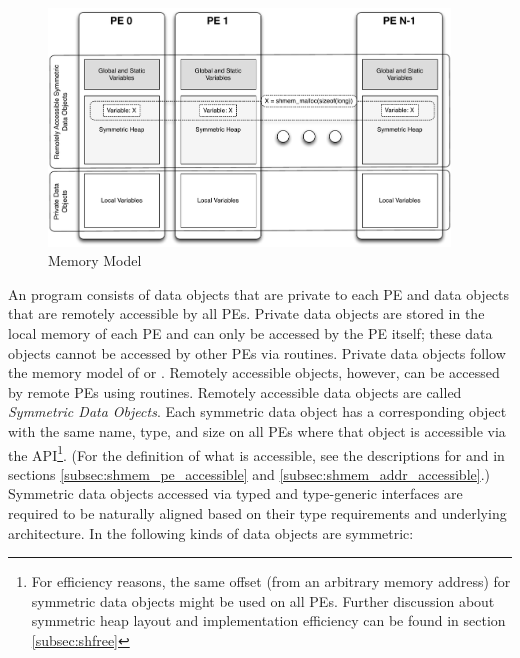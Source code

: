 \begin{figure}[h]
\includegraphics[width=0.95\textwidth]{figures/mem_model}      
\caption{\openshmem Memory Model}
\label{fig:mem_model}                                               
\end{figure}      
%
An \openshmem program consists of data objects that are private to each \ac{PE}
and data  objects that are remotely accessible by all \acp{PE}. Private data
objects are stored in the local memory of each \ac{PE} and can only be accessed
by the \ac{PE} itself; these data objects cannot be accessed by other \acp{PE}
via \openshmem routines. Private data objects follow the memory model of
\Cstd or \Fortran. Remotely accessible objects, however, can be accessed by
remote \acp{PE} using \openshmem routines.  Remotely accessible data objects are
called \emph{Symmetric Data Objects}.  Each symmetric data object has a
corresponding object with the same name, type, and size on all \acp{PE} where that object is
accessible via the \openshmem \ac{API}\footnote{For efficiency reasons,
the same offset (from an arbitrary memory address) for symmetric data
objects might be used on all \acp{PE}. Further discussion about symmetric heap
layout and implementation efficiency can be found in section
\ref{subsec:shfree}}.  (For the definition of what is accessible, see the
descriptions for  and 
in sections \ref{subsec:shmem_pe_accessible} and
\ref{subsec:shmem_addr_accessible}.) Symmetric data objects accessed via typed and
type-generic \openshmem interfaces are required to be naturally aligned based on their type
requirements and underlying architecture.  In \openshmem the following kinds of
data objects are symmetric:
%
